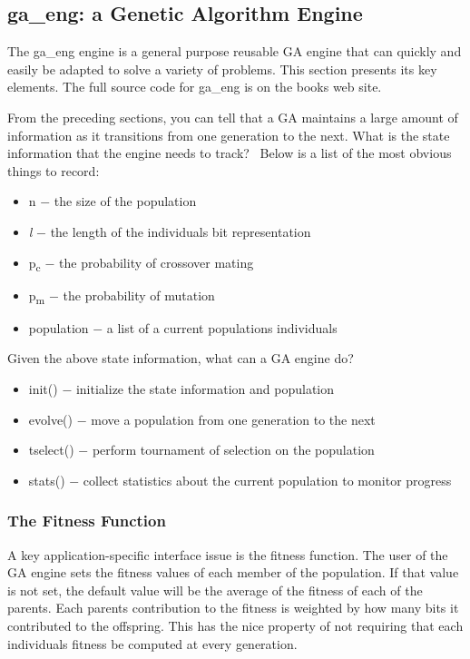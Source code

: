 \subsection[ga\_eng: a Genetic Algorithm Engine]{ga\_eng: a Genetic
Algorithm Engine}
The \textsf{ga\_eng} engine is a general purpose reusable GA engine that
can quickly and easily be adapted to solve a variety of problems. This
section presents its key elements. The full source
code for \textsf{ga\_eng} is on the book{\textquotesingle}s web site.

From the preceding sections, you can tell that a GA maintains a large
amount of information as it transitions from one generation to the
next. What is the state information that the engine needs to track?
\ Below is a list of the most obvious things to record:

\begin{itemize}
\item n $-$ the size of the population
\item \textit{l} $-$ the length of the individual{\textquotesingle}s bit
representation
\item p\textsubscript{c} $-$ the probability of crossover mating
\item p\textsubscript{m} $-$ the probability of mutation
\item population $-$ a list of a current population{\textquotesingle}s
individuals
\end{itemize}
Given the above state information, what can a GA engine do?

\begin{itemize}
\item \textsf{init()} $-$ initialize the state information and
population
\item \textsf{evolve()} $-$ move a population from one generation to the
next
\item \textsf{tselect()} $-$ perform tournament of selection on the
population
\item \textsf{stats()} $-$ collect statistics about the current
population to monitor progress
\end{itemize}
\subsubsection[The Fitness Function]{The Fitness Function}
A key application-specific interface issue is the fitness function. The
user of the GA engine sets the fitness values of each member of the
population. If that value is not set, the default value will be the
average of the fitness of each of the parents. Each
parent{\textquotesingle}s contribution to the fitness is weighted by
how many bits it contributed to the offspring. This has the nice
property of not requiring that each individual{\textquotesingle}s
fitness be computed at every generation.

